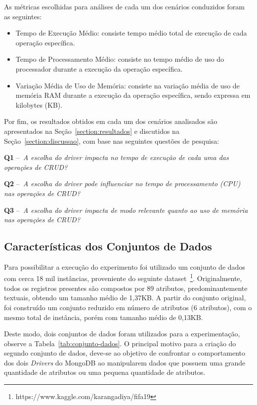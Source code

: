 \documentclass[12pt]{article}
\begin{document}
As métricas escolhidas para análises de cada um dos cenários conduzidos foram as seguintes:
\begin{itemize}
\item Tempo de Execução Médio: consiste tempo médio total de execução de cada operação específica.
\item Tempo de Processamento Médio: consiste no tempo médio de uso do processador durante a execução da operação específica.
\item Variação Média de Uso de Memória: consiste na variação média de uso de memória RAM durante a execução da operação específica, sendo expressa em kilobytes (KB).
\end{itemize}

Por fim, os resultados obtidos em cada um dos cenários analisados são apresentados na Seção~\ref{section:resultados} e discutidos na Seção~\ref{section:discussao}, com base nas seguintes questões de pesquisa:

\textbf{Q1} --~\emph{A escolha do driver impacta no tempo de execução de cada uma das operações de CRUD?}


\textbf{Q2} --~\emph{A escolha do driver pode influenciar no tempo de processamento (CPU) nas operações de CRUD?}


\textbf{Q3} --~\emph{A escolha do driver impacta de modo relevante quanto ao uso de memória nas operações de CRUD?}

\subsection{Características dos Conjuntos de Dados}

Para possibilitar a execução do experimento foi utilizado um conjunto de dados com cerca 18 mil instâncias, proveniente do seguinte dataset~\footnote{https://www.kaggle.com/karangadiya/fifa19}. Originalmente, todos os registros presentes são compostos por 89 atributos, predominantemente textuais, obtendo um tamanho médio de 1,37KB. A partir do conjunto original, foi construído um conjunto reduzido em número de atributos (6 atributos), com o mesmo total de instância, porém com tamanho médio de 0,13KB. 

Deste modo, dois conjuntos de dados foram utilizados para a experimentação, observe a Tabela~\ref{tab:conjunto-dados}. O principal motivo para a criação do segundo conjunto de dados, deve-se ao objetivo de confrontar o comportamento dos dois \emph{Drivers} do MongoDB ao manipularem dados que possuem uma grande quantidade de atributos ou uma pequena quantidade de atributos.
\end{document}
